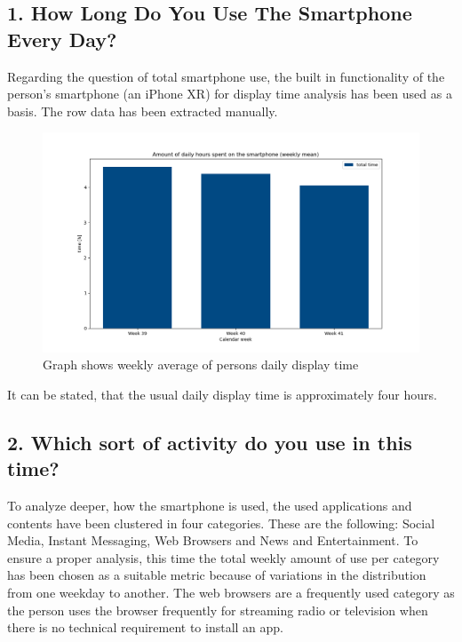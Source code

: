 \documentclass[11pt,letterpaper]{article}
\begin{document}
\subsection*{1. How Long Do You Use The Smartphone Every Day?}
Regarding the question of total smartphone use, the built in functionality of the person's smartphone (an iPhone XR) for display time analysis has been used as a basis. The row data has been extracted manually. 

\begin{figure}[h]
\centering
\includegraphics[width = \textwidth]{../data/usage-times-total.png}
\caption{Graph shows weekly average of persons daily display time}
\end{figure}

It can be stated, that the usual daily display time is approximately four hours.

\subsection*{2. Which sort of activity do you use in this time?}
To analyze deeper, how the smartphone is used, the used applications and contents have been clustered in four categories. These are the following: Social Media, Instant Messaging, Web Browsers and News and Entertainment. To ensure a proper analysis, this time the total weekly amount of use per category has been chosen as a suitable metric because of variations in the distribution from one weekday to another. The web browsers are a frequently used category as the person uses the browser frequently for streaming radio or television when there is no technical requirement to install an app.
\end{document}
